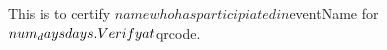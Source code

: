 \documentclass[12pt]{article}
\begin{document}
\thispagestyle{empty}
This is to certify $name who has participiated in $eventName for $num_days days.
\newline
Verify at $qrcode.
\end{document}
